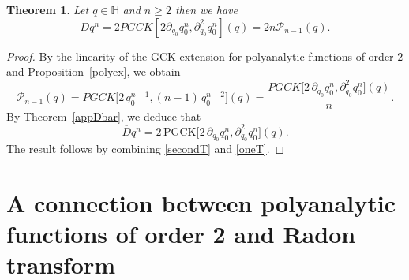 \documentclass[reqno,11pt]{amsart}
\numberwithin{equation}{section}
\newtheorem{theorem}{Theorem}[section]
\theoremstyle{definition}
\begin{document}
\begin{theorem}
\label{appmono}
Let $q \in \mathbb{H}$ and $n \geq 2$ then we have
\begin{equation}
\label{app4}
\overline{D}q^n=2 PGCK[2 \partial_{q_0} q_0^n, \partial_{q_0}^2 q_0^n](q)=2n \mathcal{P}_{n-1}(q).
\end{equation}
\end{theorem}
\begin{proof}
By the linearity of the GCK extension for polyanalytic functions of order $2$ and Proposition~\ref{polyex}, we obtain
\begin{equation}
	\label{secondT}
	\mathcal{P}_{n-1}(q)=PGCK\big[2\, q_0^{n-1}, (n-1)\, q_0^{n-2}\big](q)
	=\frac{PGCK\big[2\,\partial_{q_0} q_0^n, \partial_{q_0}^2 q_0^n\big](q)}{n}.
\end{equation}
By Theorem~\ref{appDbar}, we deduce that
\begin{equation}
	\label{oneT}
	\overline{D}q^n= 2\,\mathrm{PGCK}\big[2\,\partial_{q_0} q_0^n, \partial_{q_0}^2 q_0^n\big](q).
\end{equation}
The result follows by combining \eqref{secondT} and \eqref{oneT}.
\end{proof}




\section{A connection between polyanalytic functions of order 2 and Radon transform}
\end{document}
